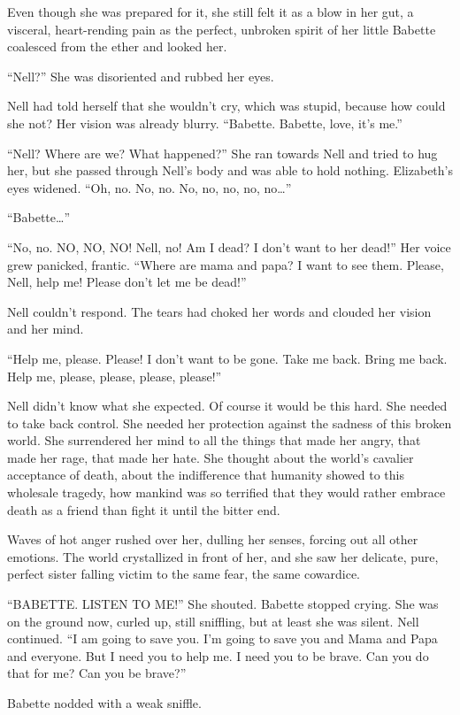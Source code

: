 Even though she was prepared for it, she still felt it as a blow in her gut, a visceral, heart-rending pain as the perfect, unbroken spirit of her little Babette coalesced from the ether and looked her.

“Nell?” She was disoriented and rubbed her eyes.

Nell had told herself that she wouldn’t cry, which was stupid, because how could she not? Her vision was already blurry. “Babette. Babette, love, it’s me.”

“Nell? Where are we? What happened?” She ran towards Nell and tried to hug her, but she passed through Nell’s body and was able to hold nothing. Elizabeth’s eyes widened. “Oh, no. No, no. No, no, no, no, no…”

“Babette…”

“No, no. NO, NO, NO! Nell, no! Am I dead? I don’t want to her dead!” Her voice grew panicked, frantic. “Where are mama and papa? I want to see them. Please, Nell, help me! Please don’t let me be dead!”

Nell couldn’t respond. The tears had choked her words and clouded her vision and her mind.

“Help me, please. Please! I don’t want to be gone. Take me back. Bring me back. Help me, please, please, please, please!”

Nell didn’t know what she expected. Of course it would be this hard. She needed to take back control. She needed her protection against the sadness of this broken world. She surrendered her mind to all the things that made her angry, that made her rage, that made her hate. She thought about the world’s cavalier acceptance of death, about the indifference that humanity showed to this wholesale tragedy, how mankind was so terrified that they would rather embrace death as a friend than fight it until the bitter end.

Waves of hot anger rushed over her, dulling her senses, forcing out all other emotions. The world crystallized in front of her, and she saw her delicate, pure, perfect sister falling victim to the same fear, the same cowardice.

“BABETTE. LISTEN TO ME!” She shouted. Babette stopped crying. She was on the ground now, curled up, still sniffling, but at least she was silent. Nell continued. “I am going to save you. I’m going to save you and Mama and Papa and everyone. But I need you to help me. I need you to be brave. Can you do that for me? Can you be brave?”

Babette nodded with a weak sniffle.

